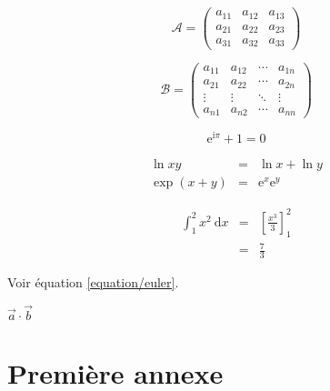 \documentclass[a4paper,11pt]{article}
\newcommand{\diff}{\ \mathrm{d}}
\begin{document}
\[
{\mathcal A} = \left (
\begin{array}{ccc}
a_{11} & a_{12} & a_{13} \\
a_{21} & a_{22} & a_{23} \\
a_{31} & a_{32} & a_{33}
\end{array}
\right )
\]

\[
{\mathcal B} = \left (
\begin{array}{cccc}
a_{11} & a_{12} & \cdots & a_{1n} \\
a_{21} & a_{22} & \cdots & a_{2n} \\
\vdots  & \vdots   & \ddots & \vdots  \\
a_{n1} & a_{n2} & \cdots & a_{nn}
\end{array}
\right )
\]

\begin{equation} \label{equation/euler}
\mathrm{e}^{\mathrm{i}\pi}+1=0
\end{equation}

\begin{eqnarray}
\ln xy                           & = & \ln x + \ln y \\
\exp \left ( x+y \right ) & = & \mathrm{e}^x  \mathrm{e}^y
\end{eqnarray}

\begin{eqnarray}
\int_1^2 x^2 \diff x & = & \left[\frac{x^3}{3}\right ]_1^2 \nonumber \\
                               & = & \frac{7}{3}
\end{eqnarray}

Voir équation \eqref{equation/euler}.

$\vec{a}\cdot\vec{b}$
\appendix
\section{Première annexe}

%
%
%


\end{document}
